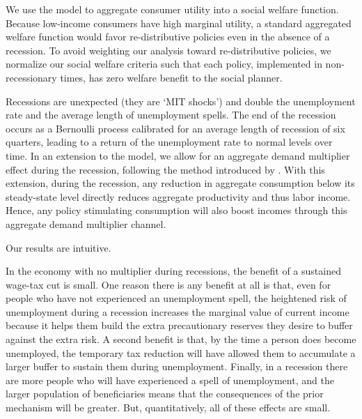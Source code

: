\documentclass[../HAFiscal]{subfiles}
\begin{document}
We use the model to aggregate consumer utility into a social welfare function. Because low-income consumers have high marginal utility, a standard aggregated welfare function would favor re-distributive policies even in the absence of a recession. To avoid weighting our analysis toward re-distributive policies, we normalize our social welfare criteria such that each policy, implemented in non-recessionary times, has zero welfare benefit to the social planner. 

Recessions are unexpected (they are `MIT shocks') and double the unemployment rate and the average length of unemployment spells. The end of the recession occurs as a Bernoulli process calibrated for an average length of recession of six quarters, leading to a return of the unemployment rate to normal levels over time. In an extension to the model, we allow for an aggregate demand multiplier effect during the recession, following the method introduced by \cite{kmpHandbook2016}. With this extension, during the recession, any reduction in aggregate consumption below its steady-state level directly reduces aggregate productivity and thus labor income. Hence, any policy stimulating consumption will also boost incomes through this aggregate demand multiplier channel.


Our results are intuitive. 

In the economy with no multiplier during recessions, the benefit of a sustained wage-tax cut is small.  One reason there is any benefit at all is that, even for people who have not experienced an unemployment spell, the heightened risk of unemployment during a recession increases the marginal value of current income because it helps them build the extra precautionary reserves they desire to buffer against the extra risk.  A second benefit is that, by the time a person does become unemployed, the temporary tax reduction will have allowed them to accumulate a larger buffer to sustain them during unemployment.  Finally, in a recession there are more people who will have experienced a spell of unemployment, and the larger population of beneficiaries means that the consequences of the prior mechanism will be greater.  But, quantitatively, all of these effects are small.
\end{document}
